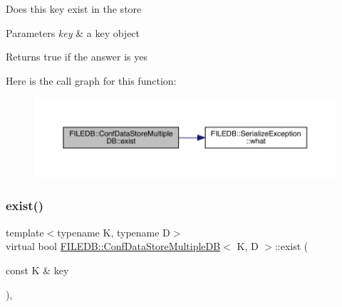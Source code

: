 Does this key exist in the store 
\begin{DoxyParams}{Parameters}
{\em key} & a key object \\
\hline
\end{DoxyParams}
\begin{DoxyReturn}{Returns}
true if the answer is yes 
\end{DoxyReturn}
Here is the call graph for this function\+:
\nopagebreak
\begin{figure}[H]
\begin{center}
\leavevmode
\includegraphics[width=350pt]{d3/dc0/classFILEDB_1_1ConfDataStoreMultipleDB_ad80312a9a4767f3b0b567932542d3ee7_cgraph}
\end{center}
\end{figure}
\mbox{\label{classFILEDB_1_1ConfDataStoreMultipleDB_ad80312a9a4767f3b0b567932542d3ee7}} 
\subsubsection{\texorpdfstring{exist()}{exist()}\hspace{0.1cm}{\footnotesize\ttfamily [3/3]}}
{\footnotesize\ttfamily template$<$typename K, typename D$>$ \\
virtual bool \mbox{\hyperlink{classFILEDB_1_1ConfDataStoreMultipleDB}{F\+I\+L\+E\+D\+B\+::\+Conf\+Data\+Store\+Multiple\+DB}}$<$ K, D $>$\+::exist (\begin{DoxyParamCaption}\item[{const K \&}]{key }\end{DoxyParamCaption})\hspace{0.3cm}{\ttfamily [inline]}, {\ttfamily [virtual]}}

